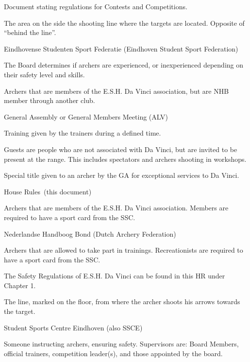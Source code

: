 \documentclass[a4paper]{article}
\newcommand{\Ahr}{House Rules} %
\newcommand{\Asr}{Safety Rules} %
\newcommand{\Awr}{Contest Rules} %
\begin{document}
\begin{description}[font=\sffamily\bfseries, leftmargin=1cm, style=nextline]
\item[{\defi \Awr}] Document stating regulations for Contests and Competitions.
\item[{\defi Downrange of the Line}] The area on the side the { shooting line} where the targets are located. Opposite of { ``behind the line''}.
    \item[{\defi ESSF}]
    Eindhovense Studenten Sport Federatie (Eindhoven Student Sport Federation)
\item[{\defi Experienced - Inexperienced}] The Board determines if { archers} are experienced, or inexperienced depending on their safety level and skills.
\item[{\defi External Member}]
{ Archers} that are members of the E.S.H. Da Vinci association, but are { NHB} member through another club.
  \item[{\defi GA}]
    General Assembly or General Members Meeting (ALV)
\item[{\defi General Training}] Training given by the trainers during a defined time.
\item[{\defi Guest}] Guests are people who are not associated with Da Vinci, but are invited to be present at the range. This includes spectators and archers shooting in workshops.
\item[{\defi Honorary Member}] Special title given to an { archer} by the { GA} for exceptional services to Da Vinci.
    \item[{\defi HR}] \Ahr\ (this document)
\item[{\defi Member}]
{ Archers} that are members of the E.S.H. Da Vinci association. Members are required to have a sport card from the { SSC}.
    \item[{\defi NHB}]
    Nederlandse Handboog Bond (Dutch Archery Federation)
\item[{\defi Recreationist}]
{ Archers} that are allowed to take part in trainings. Recreationists are required to have a sport card from the { SSC}.
    \item[{\defi \Asr}]
    The Safety Regulations of E.S.H. Da Vinci can be found in this { HR} under Chapter 1.
    \item[{\defi Shooting Line}]
    The line, marked on the floor, from where the { archer} shoots his arrows towards the target.
    \item[{\defi SSC}]
    Student Sports Centre Eindhoven (also SSCE)
\item[{\defi Supervisor}] Someone instructing { archers}, ensuring safety. Supervisors are: Board Members, official trainers, competition leader(s), and those appointed by the board.

\end{description}
\end{document}
